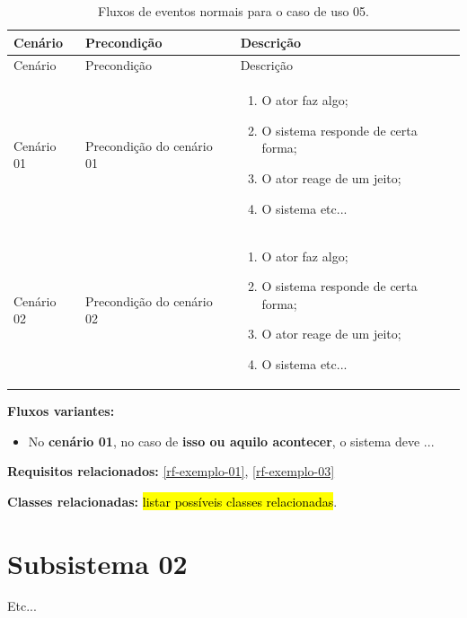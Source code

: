 \begin{longtable}{|p{2.3cm}|p{2.5cm}|p{10cm}|}
	\caption{Fluxos de eventos normais para o caso de uso 05.}
	\label{tbl-casos-de-uso-subsistema-01-exemplo-05} \\\hline 
	
	\rowcolor{lightgray}
	Cenário & Precondição & Descrição \\\hline	
	\endfirsthead
	\hline
	\rowcolor{lightgray}
	Cenário & Precondição & Descrição \\\hline
	\endhead
	
	Cenário 01 & Precondição do cenário 01 & 
	\begin{enumerate}[nosep,leftmargin=8mm]\vspace{-6mm}
			\item O ator faz algo;
			\item O sistema responde de certa forma;
			\item O ator reage de um jeito;
			\item O sistema etc...
	\vspace{-4mm}\end{enumerate} \\\hline

	Cenário 02 & Precondição do cenário 02 & 
	\begin{enumerate}[nosep,leftmargin=8mm]\vspace{-6mm}
		\item O ator faz algo;
		\item O sistema responde de certa forma;
		\item O ator reage de um jeito;
		\item O sistema etc...
	\vspace{-4mm}\end{enumerate} \\\hline
\end{longtable}


\noindent\textbf{Fluxos variantes:}\vspace{-4mm}
\begin{itemize}
	\item No \textbf{cenário 01}, no caso de \textbf{isso ou aquilo acontecer}, o sistema deve ...
\end{itemize}

\noindent\textbf{Requisitos relacionados:} \ref{rf-exemplo-01}, \ref{rf-exemplo-03}

\noindent\textbf{Classes relacionadas:} \hl{listar possíveis classes relacionadas}.
\newpage


\section{Subsistema 02}
\label{sec-casos-de-uso-subsistema-02}

Etc...


